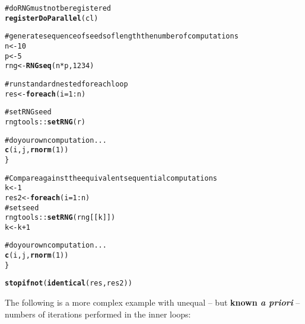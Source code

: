 \documentclass[a4paper,12pt]{article}\usepackage{graphicx, color}
\makeatletter
\newcommand{\hlfunctioncall}[1]{\textcolor[rgb]{0.501960784313725,0,0.329411764705882}{\textbf{#1}}}%
\newcommand{\hlcomment}[1]{\textcolor[rgb]{0.180392156862745,0.6,0.341176470588235}{#1}}%
\newenvironment{kframe}{%
 \def\at@end@of@kframe{}%
 \ifinner\ifhmode%
  \def\at@end@of@kframe{\end{minipage}}%
  \begin{minipage}{\columnwidth}%
 \fi\fi%
 \def\FrameCommand##1{\hskip\@totalleftmargin \hskip-\fboxsep
 \colorbox{shadecolor}{##1}\hskip-\fboxsep
     \hskip-\linewidth \hskip-\@totalleftmargin \hskip\columnwidth}%
 \MakeFramed {\advance\hsize-\width
   \@totalleftmargin\z@ \linewidth\hsize
   \@setminipage}}%
 {\par\unskip\endMakeFramed%
 \at@end@of@kframe}
\newenvironment{knitrout}{}{} %
\renewenvironment{knitrout}{\begin{footnotesize}}{\end{footnotesize}}
\makeatother
\begin{document}
\begin{knitrout}
\color{fgcolor}\begin{kframe}
\begin{alltt}

\hlcomment{# doRNG must not be registered}
\hlfunctioncall{registerDoParallel}(cl)

\hlcomment{# generate sequence of seeds of length the number of computations}
n <- 10
p <- 5
rng <- \hlfunctioncall{RNGseq}(n * p, 1234)

\hlcomment{# run standard nested foreach loop}
res <- \hlfunctioncall{foreach}(i = 1:n) %:% \hlfunctioncall{foreach}(j = 1:p, r = rng[(i - 1) * p + 1:p]) %dopar% \{
    
    \hlcomment{# set RNG seed}
    rngtools::\hlfunctioncall{setRNG}(r)
    
    \hlcomment{# do your own computation ...}
    \hlfunctioncall{c}(i, j, \hlfunctioncall{rnorm}(1))
\}

\hlcomment{# Compare against the equivalent sequential computations}
k <- 1
res2 <- \hlfunctioncall{foreach}(i = 1:n) %:% \hlfunctioncall{foreach}(j = 1:p) %do% \{
    \hlcomment{# set seed}
    rngtools::\hlfunctioncall{setRNG}(rng[[k]])
    k <- k + 1
    
    \hlcomment{# do your own computation ...}
    \hlfunctioncall{c}(i, j, \hlfunctioncall{rnorm}(1))
\}

\hlfunctioncall{stopifnot}(\hlfunctioncall{identical}(res, res2))
\end{alltt}
\end{kframe}
\end{knitrout}


The following is a more complex example with unequal -- but \textbf{known \emph{a priori}} -- 
numbers of iterations performed in the inner loops:
\end{document}
